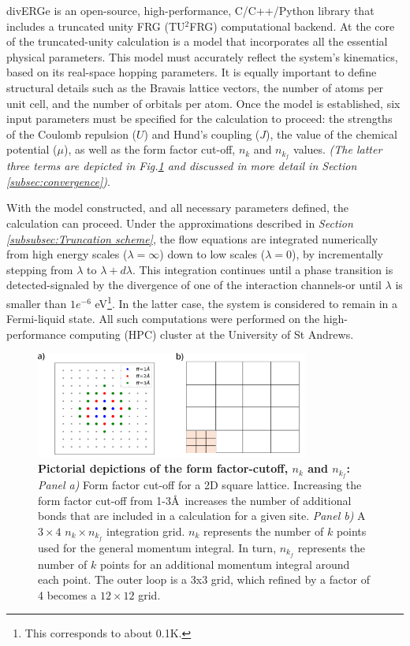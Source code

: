 \documentclass[12pt]{article}
\begin{document}
\noindent divERGe is an open-source, high-performance, C/C++/Python library that includes a truncated unity FRG (TU$^2$FRG) computational backend\cite{profe2024diverge}. 
At the core of the truncated-unity calculation is a model that incorporates all the essential physical parameters. This model must accurately reflect the system's kinematics, based on its real-space hopping parameters.
It is equally important to define structural details such as the Bravais lattice vectors, the number of atoms per unit cell, 
and the number of orbitals per atom. Once the model is established, six input parameters must be specified for the calculation to proceed: 
the strengths of the Coulomb repulsion ($U$) and Hund’s coupling ($J$), the value of the chemical potential ($\mu$), as well as the form factor cut-off, $n_k$ and $n_{k_f}$
values. \textit{(The latter three terms are depicted in Fig.\ref{fig:nknkf} and discussed in more detail in Section \ref{subsec:convergence})}.\par
\medskip
\noindent With the model constructed, and all necessary parameters defined, 
the calculation can proceed. Under the approximations described in \textit{Section \ref{subsubsec:Truncation scheme}},
the flow equations are integrated numerically from high energy scales ($\lambda = \infty$) down to low scales ($\lambda = 0$), 
by incrementally stepping from $\lambda$ to $\lambda + d\lambda$. This integration continues until a phase transition is detected-signaled 
by the divergence of one of the interaction channels-or until $\lambda$ is smaller than $1e^{-6}$ eV\footnote{This corresponds to about 0.1K.}. In the latter case, the system is considered to remain 
in a Fermi-liquid state. All such computations were performed on the high-performance computing (HPC) cluster at the University of St Andrews.

\begin{figure}[htbp]  %
    \centering
    \includegraphics[width=0.8\textwidth]{nknkfff.png}  %
    \caption{\textbf{Pictorial depictions of the form factor-cutoff, $n_k$ and $n_{k_f}$:} \textit{Panel a)}
    Form factor cut-off for a 2D square lattice. 
    Increasing the form factor cut-off from 1-3\AA\  increases the number of additional bonds
    that are included in a calculation for a given site. 
    \textit{Panel b)} A $3 \times 4$ $n_k \times n_{k_f}$ integration grid. $n_k$ represents the number of $k$ points used for the general momentum integral. In turn, 
    $n_{k_f}$ represents the number of $k$ points for an additional momentum integral around each point. The outer loop is a 3x3 grid, which refined 
    by a factor of 4 becomes a $12 \times 12$ grid.}
    \label{fig:nknkf}
\end{figure}
 
\end{document}
